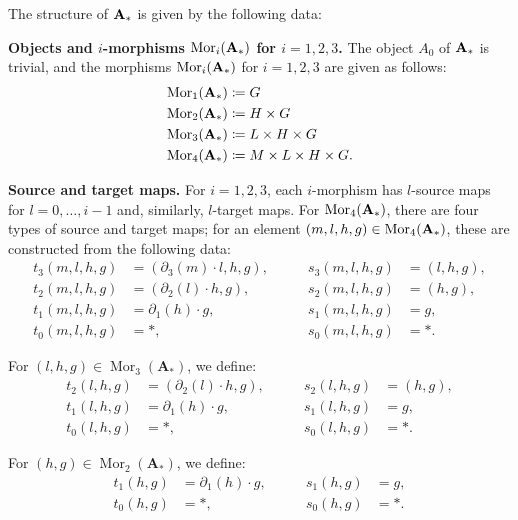 \documentclass[11pt, reqno]{amsart} %
\newcommand{\mor}{{\mathop{\mathrm{Mor}}}}
\theoremstyle{definition}
\theoremstyle{remark}
\numberwithin{equation}{section}
\begin{document}
The structure of ${\bf A_*}$ is given by the following data:

\vspace{.5em}
\noindent
{\bf Objects and $i$-morphisms $\mor_i({\bf A_*})$ for $i=1,2,3$.}
The object $A_0$ of ${\bf A_*}$ is trivial, and the morphisms $\mor_i({\bf A_*})$ for $i=1,2,3$ are given as follows:
\begin{equation*}
\begin{aligned}
\mor_1({\bf A_*}) &\coloneqq G \\
\mor_2({\bf A_*}) &\coloneqq H \times G \\
\mor_3({\bf A_*}) &\coloneqq L \times H \times G \\
\mor_4({\bf A_*}) &\coloneqq M \times L \times H \times G.
\end{aligned}
\end{equation*}

\vspace{.5em}
\noindent
{\bf Source and target maps.}
 For $i = 1,2,3$, each $i$-morphism has $l$-source maps for $l = 0, \dots ,i-1$ and, similarly, $l$-target maps. For $\mor_4({\bf A_*})$, there are four types of source and target maps; for an element $(m,l,h,g) \in \mor_4({\bf A_*})$, these are constructed from the following data:
\begin{equation*}
\begin{aligned}
t_3(m, l, h, g) &= (\partial_3(m) \cdot l, h, g ), &\qquad s_3(m, l, h, g) &= (l, h, g ), \\
t_2(m, l, h, g) &= (\partial_2(l) \cdot h, g), &\qquad s_2(m, l, h, g) &= (h,g), \\
t_1(m, l, h, g) &= \partial_1(h) \cdot g, &\qquad s_1(m, l, h, g) &= g, \\
t_0(m, l, h, g) &= *, &\qquad s_0(m, l, h, g) &= *.
\end{aligned}
\end{equation*}

For $(l, h, g) \in \mor_3(\mathbf{A}_*)$, we define:
\begin{equation*}
\begin{aligned}
t_2(l, h, g) &= (\partial_2(l) \cdot h,g), &\qquad s_2(l, h, g) &= (h,g), \\
t_1(l, h, g) &= \partial_1(h) \cdot g, &\qquad s_1(l, h, g) &= g, \\
t_0(l, h, g) &= *, &\qquad s_0(l, h, g) &= *.
\end{aligned}
\end{equation*}

For $(h, g) \in \mor_2(\mathbf{A}_*)$, we define:
\begin{equation*}
\begin{aligned}
t_1(h, g) &= \partial_1(h) \cdot g, &\qquad s_1(h, g) &= g, \\
t_0(h, g) &= *, &\qquad s_0(h, g) &= *.
\end{aligned}
\end{equation*}
\end{document}
